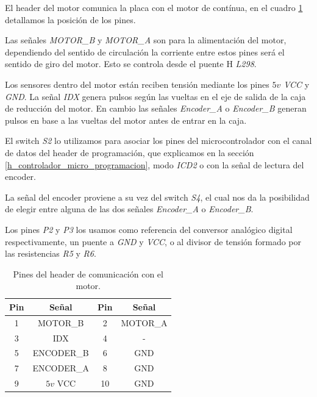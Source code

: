 El header del motor comunica la placa con el motor de cont\'inua, en el cuadro \ref{hT_placa_dc_header_motor}
detallamos la posici\'on de los pines.

Las se\~nales \emph{MOTOR\_B} y \emph{MOTOR\_A} son para la alimentaci\'on del motor, dependiendo del sentido
de circulaci\'on la corriente entre estos pines ser\'a el sentido de giro del motor.
Esto se controla desde el puente H \emph{L298}.

Los sensores dentro del motor est\'an reciben tensi\'on mediante los pines \emph{$5v$ VCC} y \emph{GND}.
La se\~nal \emph{IDX} genera pulsos seg\'un las vueltas en el eje de salida de la caja de reducci\'on del
motor.
En cambio las se\~nales \emph{Encoder\_A} o \emph{Encoder\_B} generan pulsos en base a las vueltas del motor
antes de entrar en la caja.

El switch \emph{S2} lo utilizamos para asociar los pines del microcontrolador con el canal de datos del header
de programaci\'on, que explicamos en la secci\'on \ref{h_controlador_micro_programacion}, modo \emph{ICD2} o
con la se\~nal de lectura del encoder.

La se\~nal del encoder proviene a su vez del switch \emph{S4}, el cual nos da la posibilidad de elegir entre
alguna de las dos se\~nales \emph{Encoder\_A} o \emph{Encoder\_B}.

Los pines \emph{P2} y \emph{P3} los usamos como referencia del conversor anal\'ogico digital respectivamente,
un puente a \emph{GND} y \emph{VCC}, o al divisor de tensi\'on formado por las resistencias \emph{R5} y \emph{R6}.

\begin{table}
	\begin{center}
		\begin{tabular}{|c|c|c|c|}
			\hline
			Pin & Se\~nal & Pin & Se\~nal \\
			\hline
			1 & MOTOR\_B & 2 & MOTOR\_A \\
			\hline
			3 & IDX & 4 & - \\
			\hline
			5 & ENCODER\_B & 6 & GND \\
			\hline
			7 & ENCODER\_A & 8 & GND \\
			\hline
			9 & $5v$ VCC & 10 & GND \\
			\hline
		\end{tabular}
		\caption{Pines del header de comunicaci\'on con el motor.}
		\label{hT_placa_dc_header_motor}
	\end{center}
\end{table}

